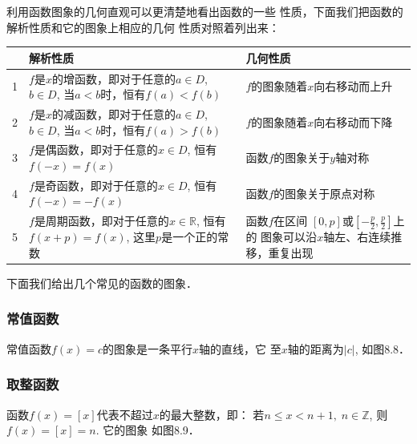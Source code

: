 利用函数图象的几何直观可以更清楚地看出函数的一些
性质，下面我们把函数的解析性质和它的图象上相应的几何
性质对照着列出来：
\begin{center}
\begin{tabular}{cp{}p{}}
    \hline
    &  解析性质  &几何性质\\
    \hline
    1  &$f$是$x$的增函数，即对于任意的$a\in D$, $b\in D$, 当$a<b$时，恒有$f(a)<
f(b)$  &$f$的图象随着$x$向右移动而上升\\
2&$f$是$x$的减函数，即对于任意的$a\in D$, $b\in D$, 当$a<b$时，恒有$f(a)>f(b)$ &$f$的图象随着$x$向右移动而下降\\
3&$f$是偶函数，即对于任意的$x\in D$, 恒有$f(-x)=f(x)$ &函数$f$的图象关于$y$轴对称\\
4& $f$是奇函数，即对于任意的$x\in D$, 恒有$f(-x)=-f(x)$ & 函数$f$的图象关于原点对称\\
5 & $f$是周期函数，即对于任意的$x\in\mathbb{R}$, 恒有$f(x+p)=f(x)$, 这里$p$是一个正的常数& 函数$f$在区间
$[0,p]$或$\left[-\frac{p}{2},\frac{p}{2}\right]$上的
图象可以沿$x$轴左、右连续推移，重复出现\\
\hline
\end{tabular}
\end{center}

下面我们给出几个常见的函数的图象．

\subsubsection{常值函数}
常值函数$f(x)=c$的图象是一条平行$x$轴的直线，它
至$x$轴的距离为$|c|$, 如图8.8．

\subsubsection{取整函数}
函数$f(x)=[x]$代表不超过$x$的最大整数，即：
若$n\le x<n+1,\; n\in\mathbb{Z}$, 则$f(x)=[x]=n$. 它的图象
如图8.9．

